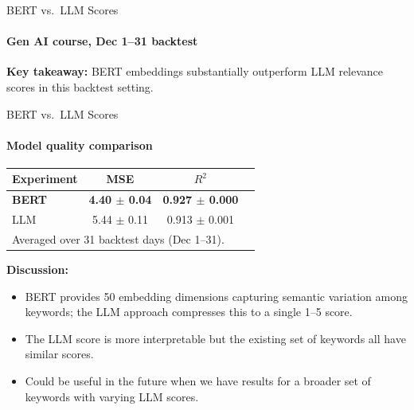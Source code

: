 \documentclass[smaller]{beamer}
\begin{document}
\begin{frame}{BERT vs.\ LLM Scores}
\framesubtitle{Gen AI course, Dec 1--31 backtest}

\begin{table}[htbp]
\centering
{}
\end{table}

\medskip
\textbf{Key takeaway:} BERT embeddings substantially outperform LLM relevance scores in this backtest setting.

\end{frame}

\begin{frame}{BERT vs.\ LLM Scores}
\framesubtitle{Model quality comparison}

\begin{table}[htbp]
\centering
\begin{tabular}{lccc}
\toprule
Experiment & MSE & $R^2$ \\
\midrule
\textbf{BERT} & \textbf{4.40 $\pm$ 0.04} & \textbf{0.927 $\pm$ 0.000} \\
LLM & 5.44 $\pm$ 0.11 & 0.913 $\pm$ 0.001 \\
\bottomrule
\multicolumn{3}{l}{\scriptsize Averaged over 31 backtest days (Dec 1--31).} \\
\end{tabular}
\end{table}

\medskip
\textbf{Discussion:}
\begin{itemize}
    \item BERT provides 50 embedding dimensions capturing semantic variation among keywords; the LLM approach compresses this to a single 1--5 score.
    \item The LLM score is more interpretable but the existing set of keywords all have similar scores.
    \item Could be useful in the future when we have results for a broader set of keywords with varying LLM scores.
\end{itemize}

\end{frame}
\end{document}
